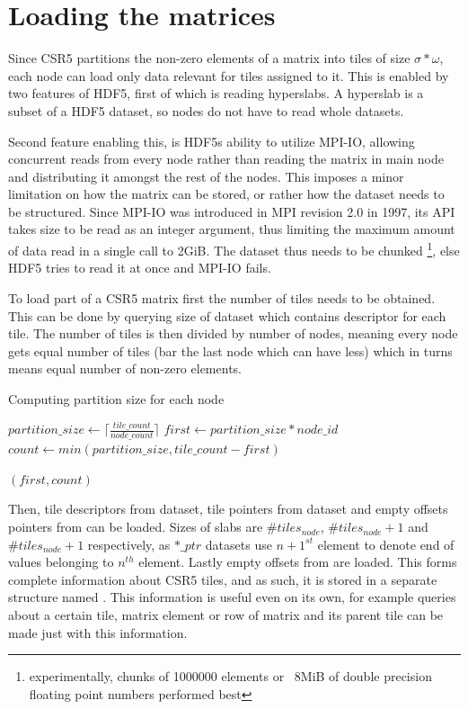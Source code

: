 \documentclass[thesis=M,english]{FITthesis}[2019/12/23]
\begin{document}
\section{Loading the matrices}


Since CSR5 partitions the non-zero elements of a matrix into tiles of 
size $\sigma * \omega$, each node can load only data relevant for tiles
assigned to it. This is enabled by two features of HDF5, first of which 
is reading hyperslabs. A hyperslab is a subset of a HDF5 dataset, so 
nodes do not have to read whole datasets. 

Second feature enabling this, is HDF5s ability to utilize MPI-IO, allowing concurrent 
reads from every node rather than reading the matrix in main node 
and distributing it amongst the rest of the nodes. This imposes a minor limitation
on how the matrix can be stored, or rather how the dataset needs to be structured.
Since MPI-IO was introduced in MPI revision 2.0 \cite{mpi20} in 1997, its API takes 
size to be read as an integer argument, thus limiting the maximum amount of data read 
in a single call to 2GiB. The dataset thus needs to be chunked 
\footnote{experimentally, chunks of 1000000 elements or ~8MiB of double precision floating 
point numbers performed best}, else HDF5 tries to read it at once and MPI-IO fails.


To load part of a CSR5 matrix first the number of tiles needs to be obtained. This can be 
done by querying size of  dataset which contains descriptor for each tile.
The number of tiles is then divided by number of nodes, meaning every node gets equal 
number of tiles (bar the last node which can have less) which in turns means equal number 
of non-zero elements.



\begin{algorithm}
    \caption{Computing partition size for each node}
    \begin{algorithmic}
        \State $partition\_size \gets \lceil\frac{tile\_count}{node\_count}\rceil$
        \State $first \gets partition\_size * node\_id$
        \State $count \gets min(partition\_size, tile\_count - first)$

        \Return $(first, count)$
        \EndFunction
    \end{algorithmic}
\end{algorithm}

Then, tile descriptors from  dataset, tile pointers from 
dataset and empty offsets pointers from  can be loaded.
Sizes of slabs are $\#tiles_{node}$, $\#tiles_{node} + 1$ and $\#tiles_{node} + 1$
respectively, as $*\_ptr$ datasets use $n+1^{st}$ element to denote end of values 
belonging to $n^{th}$ element. Lastly empty offsets from  
are loaded. This forms complete information about CSR5 tiles, and as such, it is 
stored in a separate structure named . This information is useful 
even on its own, for example queries about a certain tile, matrix element or row 
of matrix and its parent tile can be made just with this information.
\end{document}
